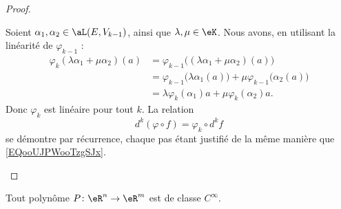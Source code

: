 \begin{proof}
	\begin{subproof}
		Soient \( \alpha_1,\alpha_2\in \aL(E,V_{k-1})\), ainsi que \( \lambda,\mu\in \eK\). Nous avons, en utilisant la linéarité de \( \varphi_{k-1}\) :
		\begin{subequations}
			\begin{align}
				\varphi_k(\lambda\alpha_1+\mu\alpha_2)(a) & =\varphi_{k-1}\big( (\lambda\alpha_1+\mu\alpha_2)(a) \big)                          \\
				                                          & =\varphi_{k-1}\big(\lambda \alpha_1(a)\big)+\mu\varphi_{k-1}\big( \alpha_2(a) \big) \\
				                                          & =\lambda\varphi_k(\alpha_1)a+\mu\varphi_k(\alpha_2)a.
			\end{align}
		\end{subequations}
		Donc \( \varphi_k\) est linéaire pour tout \( k\).
		\spitem[La relation]
		La relation
		\begin{equation}
			d^k(\varphi\circ f)=\varphi_k\circ d^kf
		\end{equation}
		se démontre par récurrence, chaque pas étant justifié de la même manière que \eqref{EQooUJPWooTzgSJx}.
	\end{subproof}
\end{proof}


\begin{proposition}		\label{PROPooMGFBooHWGXyC}
	Tout polynôme \(P \colon \eR^n\to \eR^m  \) est de classe \( C^{\infty}\).
\end{proposition}
